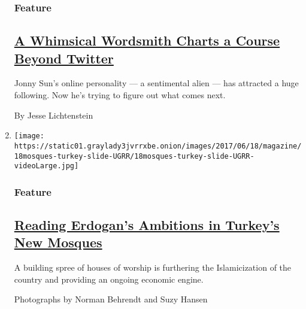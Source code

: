 \begin{enumerate}
  \hypertarget{feature-2}{%
  \subsubsection{Feature}\label{feature-2}}

  \hypertarget{a-whimsical-wordsmith-charts-a-course-beyond-twitter}{%
  \subsection{\texorpdfstring{\href{/2017/06/15/magazine/a-whimsical-wordsmith-charts-a-course-beyond-twitter.html}{A
  Whimsical Wordsmith Charts a Course Beyond
  Twitter}}{A Whimsical Wordsmith Charts a Course Beyond Twitter}}\label{a-whimsical-wordsmith-charts-a-course-beyond-twitter}}

  Jonny Sun's online personality --- a sentimental alien --- has
  attracted a huge following. Now he's trying to figure out what comes
  next.

  By Jesse Lichtenstein
\item
  \texttt{[image: https://static01.graylady3jvrrxbe.onion/images/2017/06/18/magazine/18mosques-turkey-slide-UGRR/18mosques-turkey-slide-UGRR-videoLarge.jpg]}

  \hypertarget{feature-3}{%
  \subsubsection{Feature}\label{feature-3}}

  \hypertarget{reading-erdogans-ambitions-in-turkeys-new-mosques}{%
  \subsection{\texorpdfstring{\href{/2017/06/14/magazine/reading-erdogans-ambitions-in-turkeys-new-mosques.html}{Reading
  Erdogan's Ambitions in Turkey's New
  Mosques}}{Reading Erdogan's Ambitions in Turkey's New Mosques}}\label{reading-erdogans-ambitions-in-turkeys-new-mosques}}

  A building spree of houses of worship is furthering the Islamicization
  of the country and providing an ongoing economic engine.

  Photographs by Norman Behrendt and Suzy Hansen
\end{enumerate}


